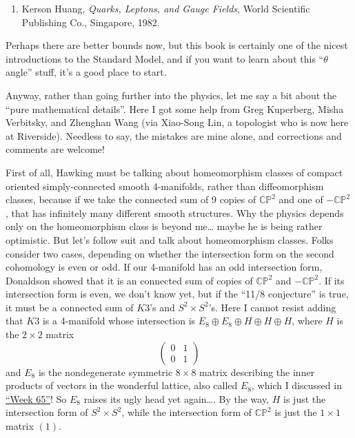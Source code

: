 \documentclass{article}
\def\tightlist{}
\begin{document}
\begin{enumerate}
\def\labelenumi{\arabic{enumi})}
\setcounter{enumi}{2}
\tightlist
\item
  Kerson Huang, \emph{Quarks, Leptons, and Gauge Fields}, World
  Scientific Publishing Co., Singapore, 1982.
\end{enumerate}

Perhaps there are better bounds now, but this book is certainly one of
the nicest introductions to the Standard Model, and if you want to learn
about this ``\(\theta\) angle'' stuff, it's a good place to start.

Anyway, rather than going further into the physics, let me say a bit
about the ``pure mathematical details''. Here I got some help from Greg
Kuperberg, Misha Verbitsky, and Zhenghan Wang (via Xiao-Song Lin, a
topologist who is now here at Riverside). Needless to say, the mistakes
are mine alone, and corrections and comments are welcome!

First of all, Hawking must be talking about homeomorphism classes of
compact oriented simply-connected smooth 4-manifolds, rather than
diffeomorphism classes, because if we take the connected sum of 9 copies
of \(\mathbb{CP}^2\) and one of \(-\mathbb{CP}^2\), that has infinitely
many different smooth structures. Why the physics depends only on the
homeomorphism class is beyond me\ldots{} maybe he is being rather
optimistic. But let's follow suit and talk about homeomorphism classes.
Folks consider two cases, depending on whether the intersection form on
the second cohomology is even or odd. If our 4-manifold has an odd
intersection form, Donaldson showed that it is an connected sum of
copies of \(\mathbb{CP}^2\) and \(-\mathbb{CP}^2\). If its intersection
form is even, we don't know yet, but if the ``11/8 conjecture'' is true,
it must be a connected sum of \(K3\)'s and \(S^2 \times S^2\)'s. Here I
cannot resist adding that \(K3\) is a 4-manifold whose intersection is
\(E_8 \oplus E_8 \oplus H \oplus H \oplus H\), where \(H\) is the
\(2\times2\) matrix \[
  \left(
    \begin{array}{cc}
      0&1\\0&1
    \end{array}
  \right)
\] and \(E_8\) is the nondegenerate symmetric \(8\times8\) matrix
describing the inner products of vectors in the wonderful lattice, also
called \(E_8\), which I discussed in \protect\hyperlink{week65}{``Week
65''}! So \(E_8\) raises its ugly head yet again\ldots. By the way,
\(H\) is just the intersection form of \(S^2 \times S^2\), while the
intersection form of \(\mathbb{CP}^2\) is just the \(1\times1\) matrix
\((1)\).
\end{document}
